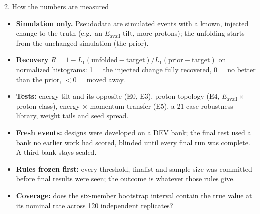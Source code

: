 \documentclass[aspectratio=169,10pt]{beamer}
\def\evidencetext{}
\begin{document}
\gdef\evidencetext{\texttt{PROTOCOL-20260925.md (3, 4, 6, 9)}}
\begin{frame}{2. How the numbers are measured}
\small\begin{itemize}
\item \textbf{Simulation only.} Pseudodata are simulated events with a known, injected change to the truth (e.g.\ an
  $E_\mathrm{avail}$ tilt, more protons); the unfolding starts from the unchanged simulation (the prior).
\item \textbf{Recovery} $R = 1 - L_1(\text{unfolded} - \text{target}) / L_1(\text{prior} - \text{target})$ on
  normalized histograms: 1 = the injected change fully recovered, 0 = no better than the prior, $< 0$ = moved away.
\item \textbf{Tests:} energy tilt and its opposite (E0, E3), proton topology (E4, $E_\mathrm{avail} \times$ proton
  class), energy $\times$ momentum transfer (E5), a 21-case robustness library, weight tails and seed spread.
\item \textbf{Fresh events:} designs were developed on a DEV bank; the final test used a bank no earlier work had
  scored, blinded until every final run was complete. A third bank stays sealed.
\item \textbf{Rules frozen first:} every threshold, finalist and sample size was committed before final results were
  seen; the outcome is whatever those rules give.
\item \textbf{Coverage:} does the six-member bootstrap interval contain the true value at its nominal rate across 120
  independent replicates?
\end{itemize}
\end{frame}
\end{document}
